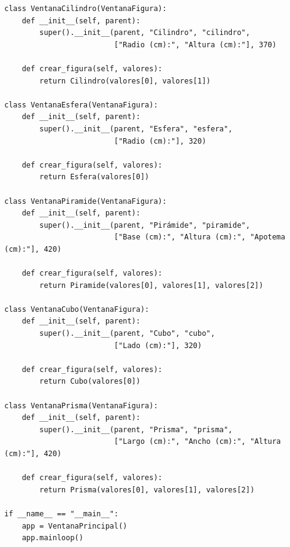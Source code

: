 \documentclass[11pt, a4paper]{article}
\begin{document}
\begin{lstlisting}
class VentanaCilindro(VentanaFigura):
    def __init__(self, parent):
        super().__init__(parent, "Cilindro", "cilindro",
                         ["Radio (cm):", "Altura (cm):"], 370)

    def crear_figura(self, valores):
        return Cilindro(valores[0], valores[1])

class VentanaEsfera(VentanaFigura):
    def __init__(self, parent):
        super().__init__(parent, "Esfera", "esfera",
                         ["Radio (cm):"], 320)

    def crear_figura(self, valores):
        return Esfera(valores[0])

class VentanaPiramide(VentanaFigura):
    def __init__(self, parent):
        super().__init__(parent, "Pirámide", "piramide",
                         ["Base (cm):", "Altura (cm):", "Apotema (cm):"], 420)

    def crear_figura(self, valores):
        return Piramide(valores[0], valores[1], valores[2])

class VentanaCubo(VentanaFigura):
    def __init__(self, parent):
        super().__init__(parent, "Cubo", "cubo",
                         ["Lado (cm):"], 320)

    def crear_figura(self, valores):
        return Cubo(valores[0])

class VentanaPrisma(VentanaFigura):
    def __init__(self, parent):
        super().__init__(parent, "Prisma", "prisma",
                         ["Largo (cm):", "Ancho (cm):", "Altura (cm):"], 420)

    def crear_figura(self, valores):
        return Prisma(valores[0], valores[1], valores[2])

if __name__ == "__main__":
    app = VentanaPrincipal()
    app.mainloop()
\end{lstlisting}
\end{document}
